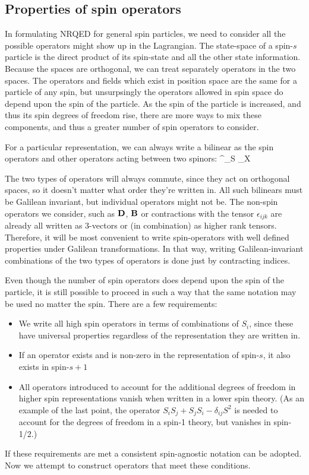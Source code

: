 \subsection{Properties of spin operators}
In formulating NRQED for general spin particles, we need to consider all the possible operators might show up in the Lagrangian.  The state-space of a spin-$s$ particle is the direct product of its spin-state and all the other state information.  Because the spaces are orthogonal, we can treat separately operators in the two spaces.  The operators and fields which exist in position space are the same for a particle of any spin, but unsurpsingly the operators allowed in spin space do depend upon the spin of the particle.  As the spin of the particle is increased, and thus its spin degrees of freedom rise, there are more ways to mix these components, and thus a greater number of spin operators to consider.

For a particular representation, we can always write a bilinear as the spin operators and other operators acting between two spinors:
\beq
	\Psi^\dagger {}_S _X \Psi
\eeq

The two types of operators will always commute, since they act on orthogonal spaces, so it doesn't matter what order they're written in.  All such bilinears must be Galilean invariant, but individual operators might not be.  The non-spin operators we consider, such as $\mathbf{D}$, $\mathbf{B}$ or contractions with the tensor $\epsilon_{ijk}$ are already all written as 3-vectors or (in combination) as higher rank tensors.  Therefore, it will be most convenient to write spin-operators with well defined properties under Galilean transformations.  In that way, writing Galilean-invariant combinations of the two types of operators is done just by contracting indices. 

Even though the number of spin operators does depend upon the spin of the particle, it is still possible to proceed in such a way that the same notation may be used no matter the spin.  There are a few requirements:
\begin{itemize}
  \item We write all high spin operators in terms of combinations of $S_i$, since these have universal properties regardless of the representation they are written in.
  \item If an operator exists and is non-zero in the representation of spin-$s$, it also exists in spin-$s+1$
  \item All operators introduced to account for the additional degrees of freedom in higher spin representations vanish when written in a lower spin theory.  (As an example of the last point, the operator $S_i S_j + S_j S_i - \delta_{ij} S^2$ is needed to account for the degrees of freedom in a spin-1 theory, but vanishes in spin-1/2.)
\end{itemize}
If these requirements are met a consistent spin-agnostic notation can be adopted.  Now we attempt to construct operators that meet these conditions.

